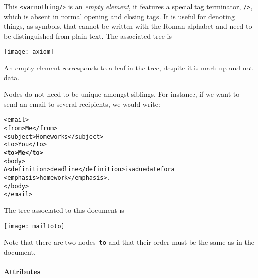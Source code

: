 This \verb|<varnothing/>| is an \emph{empty element}, it features a
special tag terminator, \verb|/>|, which is absent in normal opening
and closing tags. It is useful for denoting things, as symbols, that
cannot be written with the Roman alphabet and need to be distinguished
from plain text. The associated tree is
\begin{center}
\texttt{[image: axiom]}
\end{center}
An empty element corresponds to a leaf in the \XML tree, despite it is
mark\hyp{}up and not data.

Nodes do not need to be unique amongst siblings. For instance, if we
want to send an email to several recipients, we would write:
\begin{alltt}
<email>
  <from>Me</from>
  <subject>Homeworks</subject>
  <to>You</to>
  \textbf{<to>Me</to>} 
  <body>
  A <definition>deadline</definition> is a due date for a
<emphasis>homework</emphasis>.
  </body>
</email>
\end{alltt}
The \XML tree associated to this \XML document is
\begin{center}
\texttt{[image: mailtoto]}
\end{center}
Note that there are two nodes~\texttt{to} and that their order must be
the same as in the \XML document.

\paragraph{Attributes}

